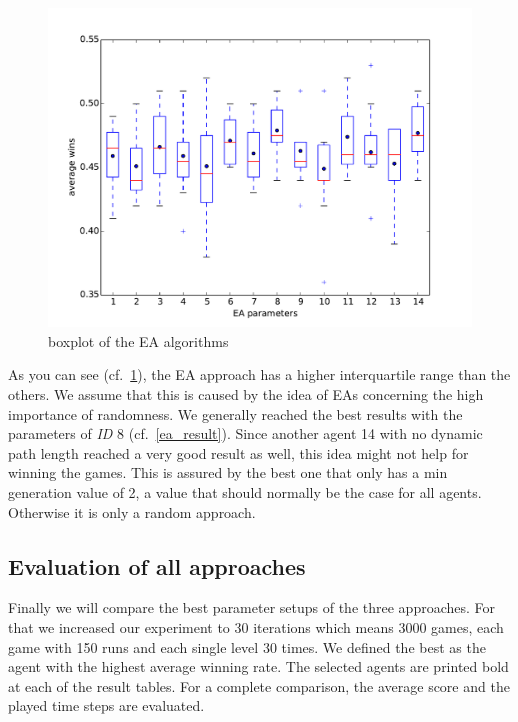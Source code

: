 \begin{figure}[H]
\centering
\includegraphics[scale=0.5]{images/eval_evolutionary.pdf}
\caption{boxplot of the \ac{EA} algorithms}
\label{fig:eval_evo}
\end{figure}

\vspace{-0.5cm}
As you can see (cf.~\cref{fig:eval_evo}), the \ac{EA} approach has a higher
interquartile range than the others.
We assume that this is caused by the idea of \acp{EA} concerning the high importance of randomness.
We generally reached the best results with the parameters of \textit{ID} 8 (cf.~\cref{ea_result}). 
Since another agent 14 with no dynamic path length reached a very good result as well, this idea might
not help for winning the games. This is assured by the best one that only has a min generation value 
of 2, a value that should normally be the case for all agents. Otherwise it is only a random approach.




\subsection{Evaluation of all approaches} 


Finally we will compare the best parameter setups of the three approaches. 
For that we increased our experiment to 30 iterations which means 3000 games, each game
with 150 runs and each single level 30 times.
We defined the best as the agent with the highest average winning rate.
The selected agents are printed bold at each of the result tables.
For a complete comparison, the average score and the played time steps are evaluated.


